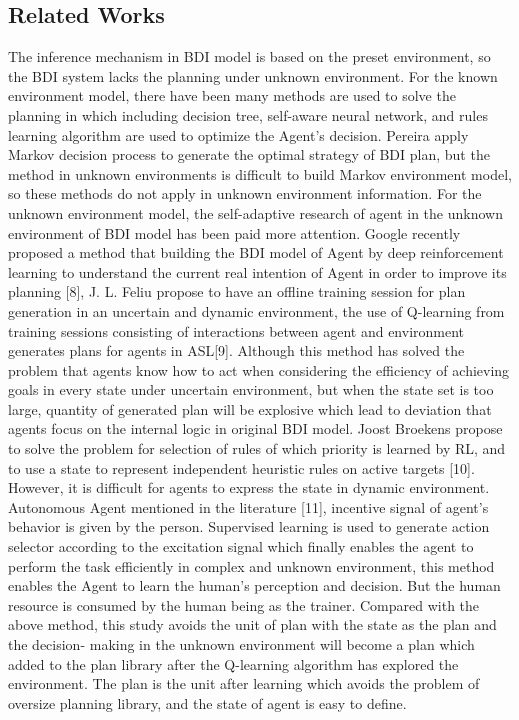 \documentclass{article}
\begin{document}
\begin{multicols}{2}
\section{Related Works}
The inference mechanism in BDI model is based on the preset
environment, so the BDI system lacks the planning under
unknown environment. For the known environment model, there
have been many methods are used to solve the planning in which
including decision tree, self-aware neural network, and rules
learning algorithm are used to optimize the Agent’s decision.
Pereira apply Markov decision process to generate the optimal
strategy of BDI plan, but the method in unknown environments is
difficult to build Markov environment model, so these methods do
not apply in unknown environment information.
For the unknown environment model, the self-adaptive research
of agent in the unknown environment of BDI model has been paid
more attention. Google recently proposed a method that building
the BDI model of Agent by deep reinforcement learning to
understand the current real intention of Agent in order to improve
its planning [8], J. L. Feliu propose to have an offline training
session for plan generation in an uncertain and dynamic
environment, the use of Q-learning from training sessions
consisting of interactions between agent and environment
generates plans for agents in ASL[9]. Although this method has
solved the problem that agents know how to act when considering
the efficiency of achieving goals in every state under uncertain
environment, but when the state set is too large, quantity of
generated plan will be explosive which lead to deviation that
agents focus on the internal logic in original BDI model. Joost
Broekens propose to solve the problem for selection of rules of
which priority is learned by RL, and to use a state to represent
independent heuristic rules on active targets [10]. However, it is
difficult for agents to express the state in dynamic environment.
Autonomous Agent mentioned in the literature [11], incentive
signal of agent's behavior is given by the person. Supervised
learning is used to generate action selector according to the
excitation signal which finally enables the agent to perform the
task efficiently in complex and unknown environment, this
method enables the Agent to learn the human’s perception and 
decision. But the human resource is consumed by the human
being as the trainer.
Compared with the above method, this study avoids the unit of
plan with the state as the plan and the decision- making in the
unknown environment will become a plan which added to the
plan library after the Q-learning algorithm has explored the
environment. The plan is the unit after learning which avoids the
problem of oversize planning library, and the state of agent is
easy to define.

\end{multicols}
\end{document}
